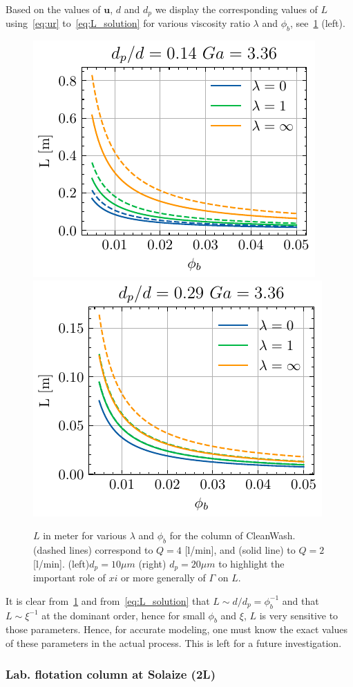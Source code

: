 Based on the values of $\textbf{u}$, $d$ and $d_p$ we display the corresponding values of $L$ using~\ref{eq:ur} to~\ref{eq:L_solution} for various viscosity ratio $\lambda$ and $\phi_b$, see~\ref{fig:height} (left). 
\begin{figure}[h!]
    \centering
    \includegraphics[height=0.40\textwidth]{image/flotation/examples/case_one.pdf}
    \includegraphics[height=0.40\textwidth]{image/flotation/examples/case_one_xi2.pdf}
    \caption{
    $L$ in meter for various $\lambda$ and $\phi_b$ for the column of CleanWash. 
    (dashed lines) correspond to $Q=4$ [l/min], and (solid line) to $Q = 2$ [l/min].
    (left)$d_p = 10\mu m$
    (right) $d_p = 20\mu m$ to highlight the important role of $xi$ or more generally of $\Gamma$ on $L$. }
    \label{fig:height}
\end{figure}
It is clear from~\ref{fig:height} and from~\ref{eq:L_solution} that $L \sim d/d_p = \phi_b^{-1}$ and that $L \sim  \xi^{-1}$ at the dominant order, hence for small $\phi_b$ and $\xi$, $L$ is very sensitive to those parameters.
Hence, for accurate modeling, one must know the exact values of these parameters in the actual process.  
This is left for a future investigation. 


\subsubsection*{Lab. flotation column at Solaize (2L)}

